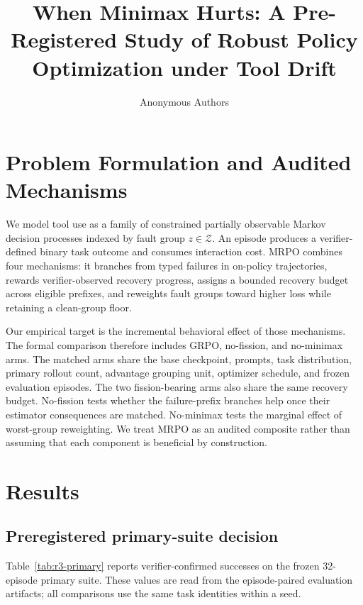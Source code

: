 \documentclass[10pt]{article}
\title{When Minimax Hurts: A Pre-Registered Study of Robust Policy Optimization under Tool Drift}
\author{Anonymous Authors}
\date{}
\newcommand{\method}{\textsc{MRPO}}
\begin{document}
\maketitle





\section{Problem Formulation and Audited Mechanisms}
\label{sec:method-overview}
We model tool use as a family of constrained partially observable Markov
decision processes indexed by fault group $z\in\mathcal{Z}$.  An episode
produces a verifier-defined binary task outcome and consumes interaction
cost.  \method{} combines four mechanisms: it branches from typed failures in
on-policy trajectories, rewards verifier-observed recovery progress, assigns
a bounded recovery budget across eligible prefixes, and reweights fault
groups toward higher loss while retaining a clean-group floor.

Our empirical target is the incremental behavioral effect of those
mechanisms.  The formal comparison therefore includes GRPO, no-fission, and
no-minimax arms.  The matched arms share the base checkpoint, prompts, task
distribution, primary rollout count, advantage grouping unit, optimizer
schedule, and frozen evaluation episodes.  The two fission-bearing arms also
share the same recovery budget.  No-fission tests
whether the failure-prefix branches help once their estimator consequences
are matched.  No-minimax tests the marginal effect of worst-group
reweighting.  We treat \method{} as an audited composite rather than assuming
that each component is beneficial by construction.



\section{Results}
\label{sec:results}

\subsection{Preregistered primary-suite decision}

Table~\ref{tab:r3-primary} reports verifier-confirmed successes on the frozen
32-episode primary suite.  These values are read from the episode-paired
evaluation artifacts; all comparisons use the same task identities within a
seed.
\end{document}
